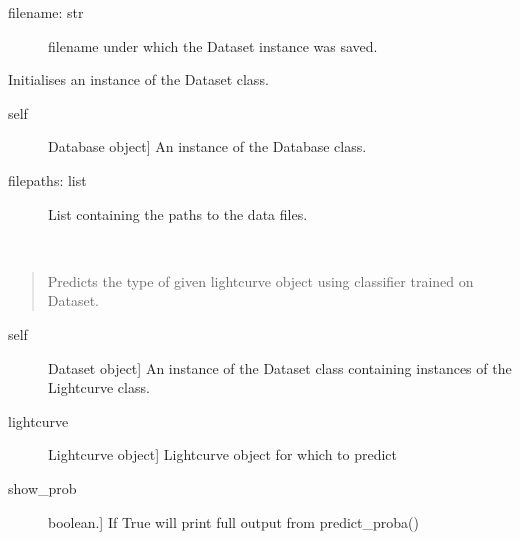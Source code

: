 \documentclass[a4paper,10pt,english]{sphinxmanual}
\begin{document}
\begin{fulllineitems}
\begin{fulllineitems}
\begin{description}
\item[{filename: str}] \leavevmode
filename under which the Dataset instance was saved.

\end{description}

\end{fulllineitems}


\begin{fulllineitems}
\label{\detokenize{api:malt.Dataset.populate}}
Initialises an instance of the Dataset class.
\begin{description}
\item[{self}] \leavevmode{[}Database object{]}
An instance of the Database class.

\item[{filepaths: list}] \leavevmode
List containing the paths to the data files.

\end{description}

\end{fulllineitems}


\begin{fulllineitems}
\label{\detokenize{api:malt.Dataset.predict}}~\begin{quote}

Predicts the type of given lightcurve object using classifier trained
on Dataset.
\end{quote}
\begin{description}
\item[{self}] \leavevmode{[}Dataset object{]}
An instance of the Dataset class containing instances of the
Lightcurve class.

\item[{lightcurve}] \leavevmode{[}Lightcurve object{]}
Lightcurve object for which to predict

\item[{show\_prob}] \leavevmode{[}boolean.{]}
If True will print full output from predict\_proba()

\end{description}


\end{fulllineitems}
\end{fulllineitems}
\end{document}
